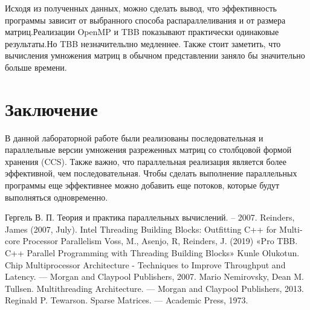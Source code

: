 \documentclass{report}
\begin{document}
\par Исходя из полученных данных, можно сделать вывод, что эффективность программы зависит от выбранного способа распараллеливания и от размера матриц.Реализации OpenMP и TBB показывают практически одинаковые результаты.Но TBB незначительлно медленнее. Также стоит заметить, что вычисления умножения матриц в обычном представлении заняло бы значительно больше времени. 
\newpage

\section*{Заключение}
В данной лабораторной работе были реализованы последовательная и параллельные версии умножения разреженных матриц со столбцовой формой хранения (CCS). Также важно, что параллельная реализация является более эффективной, чем последовательная. Чтобы сделать выполнение параллельных программы еще эффективнее можно добавить еще потоков, которые будут выполняться одновременно.

\newpage

\begin{thebibliography}{1}
Гергель В. П. Теория и практика параллельных вычислений. – 2007. 
Reinders, James (2007, July). Intel Threading Building Blocks: Outfitting C++ for Multi-core Processor Parallelism
Voss, M., Asenjo, R, Reinders, J. (2019) «Pro TBB. C++ Parallel Programming with Threading Building Blocks»
Kunle Olukotun. Chip Multiprocessor Architecture - Techniques to Improve Throughput and Latency. — Morgan and Claypool Publishers, 2007.
Mario Nemirovsky, Dean M. Tullsen. Multithreading Architecture. — Morgan and Claypool Publishers, 2013.
Reginald P. Tewarson. Sparse Matrices. — Academic Press, 1973.
\end{thebibliography}
\newpage

\end{document}
